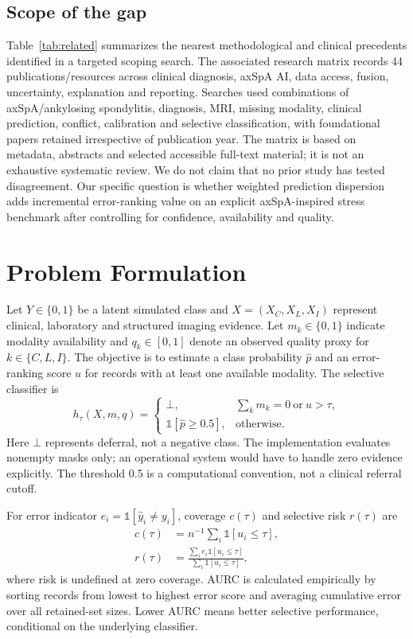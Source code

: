\documentclass[conference]{IEEEtran}
\begin{document}
\subsection{Scope of the gap}
Table~\ref{tab:related} summarizes the nearest methodological and clinical precedents identified in a targeted scoping search. The associated research matrix records 44 publications/resources across clinical diagnosis, axSpA AI, data access, fusion, uncertainty, explanation and reporting. Searches used combinations of axSpA/ankylosing spondylitis, diagnosis, MRI, missing modality, clinical prediction, conflict, calibration and selective classification, with foundational papers retained irrespective of publication year. The matrix is based on metadata, abstracts and selected accessible full-text material; it is not an exhaustive systematic review. We do not claim that no prior study has tested disagreement. Our specific question is whether weighted prediction dispersion adds incremental error-ranking value on an explicit axSpA-inspired stress benchmark after controlling for confidence, availability and quality.
\section{Problem Formulation}
Let $Y\in\{0,1\}$ be a latent simulated class and $X=(X_C,X_L,X_I)$ represent clinical, laboratory and structured imaging evidence. Let $m_k\in\{0,1\}$ indicate modality availability and $q_k\in[0,1]$ denote an observed quality proxy for $k\in\{C,L,I\}$. The objective is to estimate a class probability $\hat p$ and an error-ranking score $u$ for records with at least one available modality. The selective classifier is
\begin{equation}
 h_\tau(X,m,q)=\begin{cases}\bot,&\sum_km_k=0\ \text{or}\ u>\tau,\\\mathbb{1}[\hat p\geq 0.5],&\text{otherwise}.\end{cases}
\end{equation}
Here $\bot$ represents deferral, not a negative class. The implementation evaluates nonempty masks only; an operational system would have to handle zero evidence explicitly. The threshold 0.5 is a computational convention, not a clinical referral cutoff.

For error indicator $e_i=\mathbb{1}[\hat y_i\neq y_i]$, coverage $c(\tau)$ and selective risk $r(\tau)$ are
\begin{align}
c(\tau)&=n^{-1}\sum_i\mathbb{1}[u_i\leq\tau],\\
r(\tau)&=\frac{\sum_i e_i\mathbb{1}[u_i\leq\tau]}{\sum_i\mathbb{1}[u_i\leq\tau]},
\end{align}
where risk is undefined at zero coverage. AURC is calculated empirically by sorting records from lowest to highest error score and averaging cumulative error over all retained-set sizes. Lower AURC means better selective performance, conditional on the underlying classifier.
\end{document}
